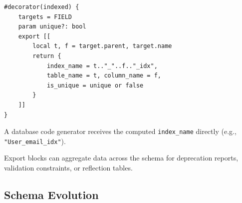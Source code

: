 \documentclass[10pt,onecolumn]{article}
\begin{document}
\begin{minipage}{\textwidth}
\vspace{4pt}
\begin{minipage}[t]{0.58\textwidth}
\begin{lstlisting}[language=bebop,basicstyle=\ttfamily\footnotesize]
#decorator(indexed) {
    targets = FIELD
    param unique?: bool
    export [[
        local t, f = target.parent, target.name
        return {
            index_name = t.."_"..f.."_idx",
            table_name = t, column_name = f,
            is_unique = unique or false
        }
    ]]
}
\end{lstlisting}
\end{minipage}\hfill
\begin{minipage}[t]{0.38\textwidth}
\small
\raggedright
A database code generator receives the computed \texttt{index\_name} directly (e.g., \texttt{"User\_email\_idx"}).

\vspace{4pt}
Export blocks can aggregate data across the schema for deprecation reports, validation constraints, or reflection tables.
\end{minipage}
\end{minipage}

\subsection{Schema Evolution}
\label{sec:evolution}
\end{document}
